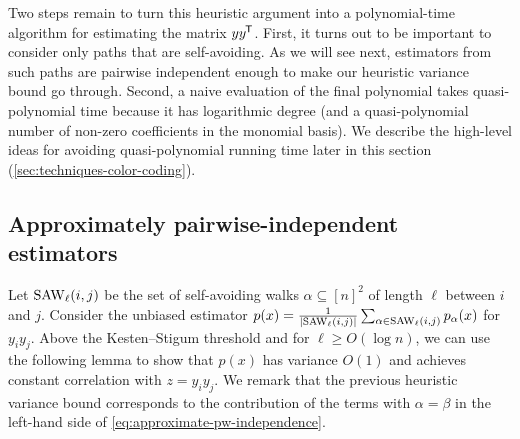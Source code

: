 Two steps remain to turn this heuristic argument into a polynomial-time algorithm for estimating the matrix $yy{}^{\mkern-1.5mu\mathsf{T}}$.
First, it turns out to be important to consider only paths that are self-avoiding.
As we will see next, estimators from such paths are pairwise independent enough to make our heuristic variance bound go through.
Second, a naive evaluation of the final polynomial takes quasi-polynomial time because it has logarithmic degree (and a quasi-polynomial number of non-zero coefficients in the monomial basis).
We describe the high-level ideas for avoiding quasi-polynomial running time later in this section (\cref{sec:techniques-color-coding}).

\subsection{Approximately pairwise-independent estimators}

Let $\mathrm{SAW}_\ell(i,j)$ be the set of self-avoiding walks $\alpha\subseteq [n]^2$ of length $\ell$ between $i$ and $j$.
Consider the unbiased estimator $p(x)=\tfrac 1{\lvert\mathrm{SAW}_\ell(i,j)\rvert}\sum_{\alpha \in \mathrm{SAW}_\ell(i,j)} p_\alpha(x)$ for $y_iy_j$.
Above the Kesten--Stigum threshold and for $\ell\ge O(\log n)$, we can use the following lemma to show that $p(x)$ has variance $O(1)$ and achieves constant correlation with $z=y_i y_j$.
We remark that the previous heuristic variance bound corresponds to the contribution of the terms with $\alpha=\beta$ in the left-hand side of \cref{eq:approximate-pw-independence}.

